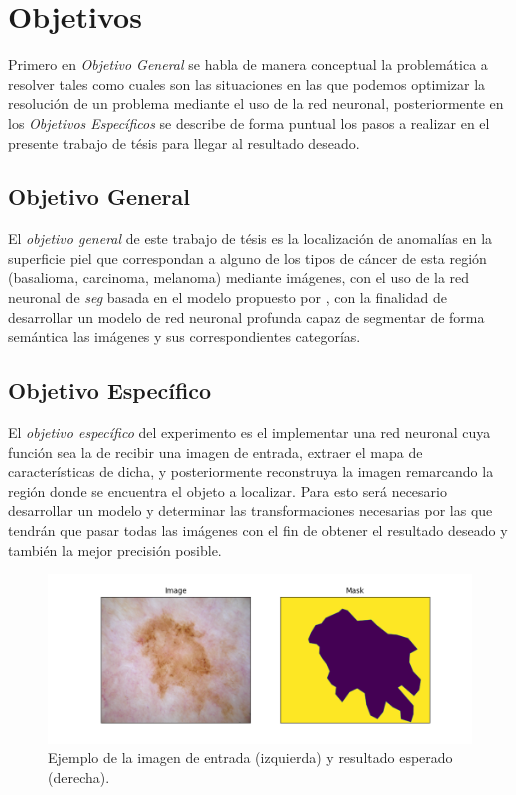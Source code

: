 \section{Objetivos}
Primero en \emph{Objetivo General} se habla de manera conceptual la problemática a resolver tales como cuales son las situaciones en las que podemos optimizar la resolución de un problema mediante el uso de la red neuronal, posteriormente en los \emph{Objetivos Específicos} se describe de forma puntual los pasos a realizar en el presente trabajo de tésis para llegar al resultado deseado.
\subsection{Objetivo General}
El \emph{objetivo general} de este trabajo de tésis es la localización de anomalías en la superficie piel que correspondan a alguno de los tipos de cáncer de esta región (basalioma, carcinoma, melanoma) mediante imágenes, con el uso de la red neuronal de \emph{\gls{seg}} basada en el modelo propuesto por \citet{wu2019fastfcn}, con la finalidad de desarrollar un modelo de red neuronal profunda capaz de segmentar de forma semántica las imágenes y sus correspondientes categorías.
\subsection{Objetivo Específico}
El \emph{objetivo específico} del experimento es el implementar una red neuronal cuya función sea la de recibir una imagen de entrada, extraer el mapa de características de dicha, y posteriormente reconstruya la imagen remarcando la región donde se encuentra el objeto a localizar. Para esto será necesario desarrollar un modelo y determinar las transformaciones necesarias por las que tendrán que pasar todas las imágenes con el fin de obtener el resultado deseado y también la mejor precisión posible.

\begin{figure}[h!]
    \includegraphics[width=150mm]{Figuras/plot_masks.png}
    \centering
    \caption{Ejemplo de la imagen de entrada (izquierda) y resultado esperado (derecha).}
    \label{fig:desired}
\end{figure}

